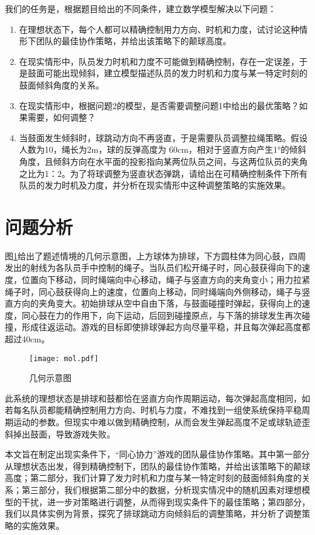 \documentclass[withoutpreface,bwprint]{cumcmthesis} %
\begin{document}
我们的任务是，根据题目给出的不同条件，建立数学模型解决以下问题：
\begin{enumerate}
\item 在理想状态下，每个人都可以精确控制用力方向、时机和力度，试讨论这种情形下团队的最佳协作策略，并给出该策略下的颠球高度。
\item 在现实情形中，队员发力时机和力度不可能做到精确控制，存在一定误差，于是鼓面可能出现倾斜，建立模型描述队员的发力时机和力度与某一特定时刻的鼓面倾斜角度的关系。
\item 在现实情形中，根据问题2的模型，是否需要调整问题1中给出的最优策略？如果需要，如何调整？
\item 当鼓面发生倾斜时，球跳动方向不再竖直，于是需要队员调整拉绳策略。假设人数为10，绳长为2m，球的反弹高度为 60cm，相对于竖直方向产生1°的倾斜角度，且倾斜方向在水平面的投影指向某两位队员之间，与这两位队员的夹角之比为1：2。为了将球调整为竖直状态弹跳，请给出在可精确控制条件下所有队员的发力时机及力度，并分析在现实情形中这种调整策略的实施效果。
\end{enumerate}

\section{问题分析}
图\ref{fig:mol}给出了题述情境的几何示意图，上方球体为排球，下方圆柱体为同心鼓，四周发出的射线为各队员手中控制的绳子。当队员们松开绳子时，同心鼓获得向下的速度，位置向下移动，同时绳端向中心移动，绳子与竖直方向的夹角变小；用力拉紧绳子时，同心鼓获得向上的速度，位置向上移动，同时绳端向外侧移动，绳子与竖直方向的夹角变大。初始排球从空中自由下落，与鼓面碰撞时弹起，获得向上的速度，同心鼓在力的作用下，向下运动，后回到碰撞原点，与下落的排球发生再次碰撞，形成往返运动。游戏的目标即使排球弹起方向尽量平稳，并且每次弹起高度都超过40cm。

\begin{figure}
	\centering
	\texttt{[image: mol.pdf]}
	\caption{几何示意图}
	\label{fig:mol} %
\end{figure}

此系统的理想状态是排球和鼓都恰在竖直方向作周期运动，每次弹起高度相同，如若每名队员都能精确控制用力方向、时机与力度，不难找到一组使系统保持平稳周期运动的参数。但现实中难以做到精确控制，从而会发生弹起高度不足或球轨迹歪斜掉出鼓面，导致游戏失败。

本文旨在制定出现实条件下，“同心协力”游戏的团队最佳协作策略。其中第一部分从理想状态出发，得到精确控制下，团队的最佳协作策略，并给出该策略下的颠球高度；第二部分，我们计算了发力时机和力度与某一特定时刻的鼓面倾斜角度的关系；第三部分，我们根据第二部分中的数据，分析现实情况中的随机因素对理想模型的干扰，进一步对策略进行调整，从而得到现实条件下的最佳策略；第四部分，我们以具体实例为背景，探究了排球跳动方向倾斜后的调整策略，并分析了调整策略的实施效果。
\end{document}
